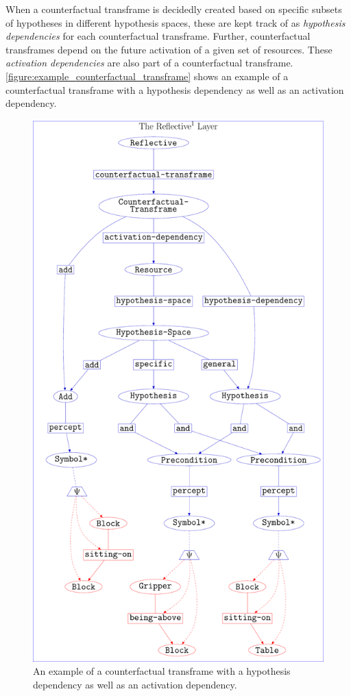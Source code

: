When a counterfactual transframe is decidedly created based on
specific subsets of hypotheses in different hypothesis spaces, these
are kept track of as \emph{hypothesis dependencies} for each
counterfactual transframe.  Further, counterfactual transframes depend
on the future activation of a given set of resources.  These
\emph{activation dependencies} are also part of a counterfactual
transframe.
{\mbox{\autoref{figure:example_counterfactual_transframe}}} shows an
example of a counterfactual transframe with a hypothesis dependency as
well as an activation dependency.
\begin{figure}
\center
\includegraphics[width=12cm]{gfx/example_counterfactual_transframe}
\caption[An example of a counterfactual transframe.]{An example of a
  counterfactual transframe with a hypothesis dependency as well as an
  activation dependency.}
\label{figure:example_counterfactual_transframe}
\end{figure}

